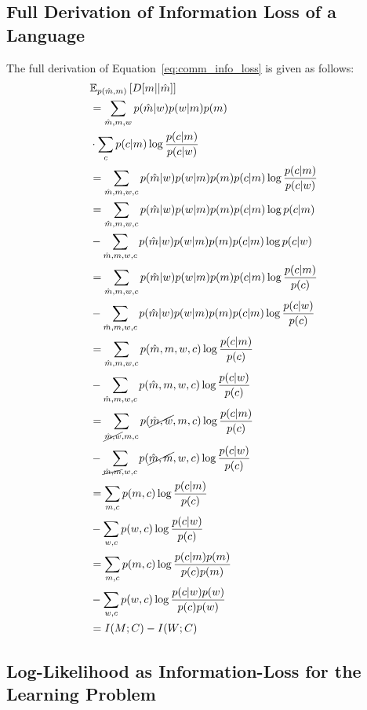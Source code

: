 \documentclass[11pt]{article}
\begin{document}
\subsection{Full Derivation of Information Loss of a Language}
\label{appssec:derivation_of_info_loss}

The full derivation of Equation~\ref{eq:comm_info_loss} is given as follows:
\begin{equation}
   \begin{aligned}
        & \mathbb{E}_{p(\hat{m},m)}\left[D[m||\hat{m}]\right] \\
        & = \sum_{\hat{m},m,w} p(\hat{m}|w)p(w|m)p(m) \\ 
        & \cdot \sum_{c} p(c|m) \log \frac{p(c|m)}{p(c|w)} \\
        & = \sum_{\hat{m},m,w,c} p(\hat{m}|w)p(w|m)p(m)p(c|m)\log \frac{p(c|m)}{p(c|w)} \\
        & = \sum_{\hat{m},m,w,c} p(\hat{m}|w)p(w|m)p(m)p(c|m) \log p(c|m) \\
        & - \sum_{\hat{m},m,w,c} p(\hat{m}|w)p(w|m)p(m)p(c|m) \log p(c|w) \\ 
        & = \sum_{\hat{m},m,w,c} p(\hat{m}|w)p(w|m)p(m)p(c|m) \log \frac{p(c|m)}{p(c)} \\ 
        & - \sum_{\hat{m},m,w,c} p(\hat{m}|w)p(w|m)p(m)p(c|m) \log \frac{p(c|w)}{p(c)} \\ 
        & = \sum_{\hat{m},m,w,c} p(\hat{m},m,w,c) \log \frac{p(c|m)}{p(c)} \\
        & - \sum_{\hat{m},m,w,c} p(\hat{m},m,w,c) \log \frac{p(c|w)}{p(c)} \\ 
        & = \sum_{\cancel{\hat{m},w},m,c} p(\cancel{\hat{m},w},m,c) \log \frac{p(c|m)}{p(c)} \\ 
        & - \sum_{\cancel{\hat{m},m},w,c} p(\cancel{\hat{m},m},w,c) \log \frac{p(c|w)}{p(c)} \\ 
        & = \sum_{m,c} p(m,c) \log \frac{p(c|m)}{p(c)} \\ 
        & - \sum_{w,c} p(w,c) \log \frac{p(c|w)}{p(c)} \\ 
        & = {\sum_{m,c} p(m,c) \log \frac{p(c|m)p(m)}{p(c)p(m)}} \\ 
        & - {\sum_{w,c} p(w,c) \log \frac{p(c|w)p(w)}{p(c)p(w)}} \\  
        & = {I(M;C)} - {I(W;C)} 
    \end{aligned} 
     \label{eq:factorise_distortion}
\end{equation}


\subsection{Log-Likelihood as Information-Loss for the Learning Problem}
\label{appssec:ll_learning_loss}
\end{document}
